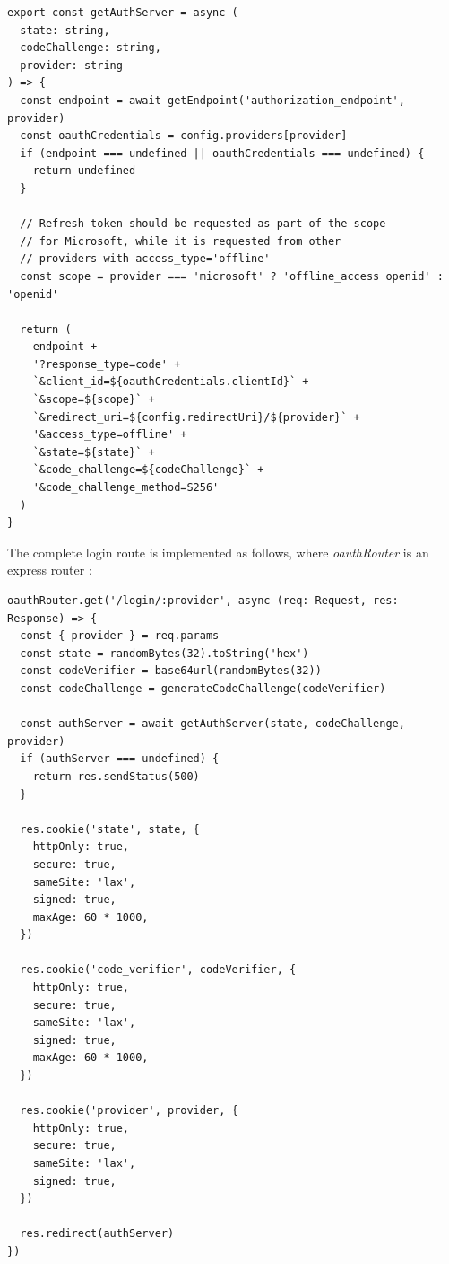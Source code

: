 \begin{enumerate}
\begin{lstlisting}[style=ES6, caption={Constructing the authorization server URL}]
export const getAuthServer = async (
  state: string,
  codeChallenge: string,
  provider: string
) => {
  const endpoint = await getEndpoint('authorization_endpoint', provider)
  const oauthCredentials = config.providers[provider]
  if (endpoint === undefined || oauthCredentials === undefined) {
    return undefined
  }

  // Refresh token should be requested as part of the scope  
  // for Microsoft, while it is requested from other
  // providers with access_type='offline'
  const scope = provider === 'microsoft' ? 'offline_access openid' : 'openid'

  return (
    endpoint +
    '?response_type=code' +
    `&client_id=${oauthCredentials.clientId}` +
    `&scope=${scope}` +
    `&redirect_uri=${config.redirectUri}/${provider}` +
    '&access_type=offline' +
    `&state=${state}` +
    `&code_challenge=${codeChallenge}` +
    '&code_challenge_method=S256'
  )
}
\end{lstlisting}

    The complete login route is implemented as follows, where \textit{oauthRouter} is an express router \citep{noauthor_express_nodate}:
\begin{lstlisting}[style=ES6, caption={Login route}]
oauthRouter.get('/login/:provider', async (req: Request, res: Response) => {
  const { provider } = req.params
  const state = randomBytes(32).toString('hex')
  const codeVerifier = base64url(randomBytes(32))
  const codeChallenge = generateCodeChallenge(codeVerifier)

  const authServer = await getAuthServer(state, codeChallenge, provider)
  if (authServer === undefined) {
    return res.sendStatus(500)
  }

  res.cookie('state', state, {
    httpOnly: true,
    secure: true,
    sameSite: 'lax',
    signed: true,
    maxAge: 60 * 1000,
  })

  res.cookie('code_verifier', codeVerifier, {
    httpOnly: true,
    secure: true,
    sameSite: 'lax',
    signed: true,
    maxAge: 60 * 1000,
  })

  res.cookie('provider', provider, {
    httpOnly: true,
    secure: true,
    sameSite: 'lax',
    signed: true,
  })

  res.redirect(authServer)
})
\end{lstlisting}


\end{enumerate}
